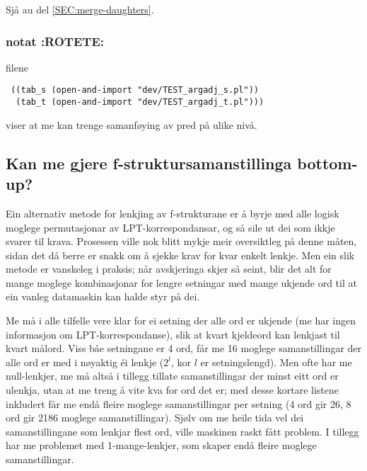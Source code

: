 \documentclass[11pt,a4paper,oneside,draft]{book}
\begin{document}
Sjå au del \ref{SEC:merge-daughters}.

\subsubsection{notat \textbf{:ROTETE:}}
\label{sec-4.1.2.3}

filene 
\begin{verbatim}
 ((tab_s (open-and-import "dev/TEST_argadj_s.pl"))
  (tab_t (open-and-import "dev/TEST_argadj_t.pl")))
\end{verbatim}

viser at me kan trenge samanføying av pred på ulike nivå.
\subsection{Kan me gjere f-struktursamanstillinga bottom-up?}
\label{sec-4.1.3}

Ein alternativ metode for lenkjing av f-strukturane er å byrje med
alle logisk moglege permutasjonar av LPT-korrespondansar, og så sile
ut dei som ikkje svarer til krava. Prosessen ville nok blitt mykje
meir oversiktleg på denne måten, sidan det då berre er snakk om å
sjekke krav for kvar enkelt lenkje.  Men ein slik metode er vanskeleg
i praksis; når avskjeringa skjer så seint, blir det alt for mange
moglege kombinasjonar for lengre setningar med mange ukjende ord til
at ein vanleg datamaskin kan halde styr på dei.

Me må i alle tilfelle vere klar for ei setning der alle ord er ukjende
(me har ingen informasjon om LPT-korrespondanse), slik at kvart
kjeldeord kan lenkjast til kvart målord. Viss båe setningane er 4 ord,
får me 16 moglege samanstillingar der alle ord er med i nøyaktig éi
lenkje ($2^l$, kor $l$ er setningslengd). Men ofte har me
null-lenkjer, me må altså i tillegg tillate samanstillingar der minst
eitt ord er ulenkja, utan at me treng å vite kva for ord det er; med
desse kortare listene inkludert får me endå fleire moglege
samanstillingar per setning (4 ord gir 26, 8 ord gir 2186 moglege
samanstillingar). Sjølv om me heile tida vel dei samanstillingane som
lenkjar flest ord, ville maskinen raskt fått problem. I tillegg har me
problemet med 1-mange-lenkjer, som skaper endå fleire moglege
samanstillingar.
\end{document}
